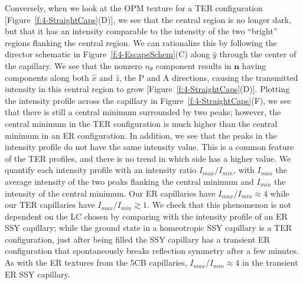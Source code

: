 Conversely, when we look at the OPM texture for a TER configuration [Figure~\ref{f:4-StraightCaps}(D)], we see that the central region is no longer dark, but that it has an intensity comparable to the intensity of the two ``bright'' regions flanking the central region.
We can rationalize this by following the director schematic in Figure~\ref{f:4-EscapeSchem}(C) along $\hat{y}$ through the center of the capillary.
We see that the nonzero $n_{\theta}$ component results in $\mathbf{n}$ having components along both $\hat{x}$ and $\hat{z}$, the P and A directions, causing the transmitted intensity in this central region to grow [Figure~\ref{f:4-StraightCaps}(D)].
Plotting the intensity profile across the capillary in Figure~\ref{f:4-StraightCaps}(F), we see that there is still a central minimum surrounded by two peaks; however, the central minimum in the TER configuration is much higher than the central minimum in an ER configuration.
In addition, we see that the peaks in the intensity profile do not have the same intensity value.
This is a common feature of the TER profiles, and there is no trend in which side has a higher value.
We quantify each intensity profile with an intensity ratio $I_{max}/I_{min}$, with $I_{max}$ the average intensity of the two peaks flanking the central minimum and $I_{min}$ the intensity of the central minimum.
Our ER capillaries have $I_{max}/I_{min} \approx 4$ while our TER capillaries have $I_{max}/I_{min} \gtrsim 1$.
We check that this phenomenon is not dependent on the LC chosen by comparing with the intensity profile of an ER SSY capillary; while the ground state in a homeotropic SSY capillary is a TER configuration, just after being filled the SSY capillary has a transient ER configuration that spontaneously breaks reflection symmetry after a few minutes.
As with the ER textures from the 5CB capillaries, $I_{max}/I_{min} \approx 4$ in the transient ER SSY capillary.




